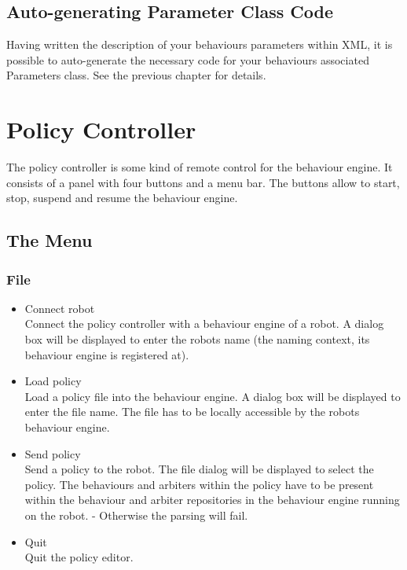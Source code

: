 \subsection{Auto-generating Parameter Class Code}
\label{sec:makeParams}

Having written the description of your behaviours parameters within
XML, it is possible to auto-generate the necessary code for your
behaviours associated Parameters class. See the previous chapter for
details.

\section{Policy Controller}

The policy controller is some kind of remote control for the behaviour
engine. It consists of a panel with four buttons and a menu bar. The
buttons allow to start, stop, suspend and resume the behaviour engine.

\subsection{The Menu}

\subsubsection{File}
\begin{itemize}
\item Connect robot \\
  Connect the policy controller with a behaviour
  engine of a robot. A dialog box will be displayed to enter the
  robots name (the naming context, its behaviour engine is registered
  at).
\item Load policy \\
  Load a policy file into the behaviour engine. A dialog box will be
  displayed to enter the file name. The file has to be locally
  accessible by the robots behaviour engine.
\item Send policy \\
  Send a policy to the robot.  The file dialog will be displayed to
  select the policy. The behaviours and arbiters within the policy
  have to be present within the behaviour and arbiter repositories in
  the behaviour engine running on the robot. - Otherwise the parsing
  will fail.
\item Quit \\
  Quit the policy editor.
\end{itemize}

